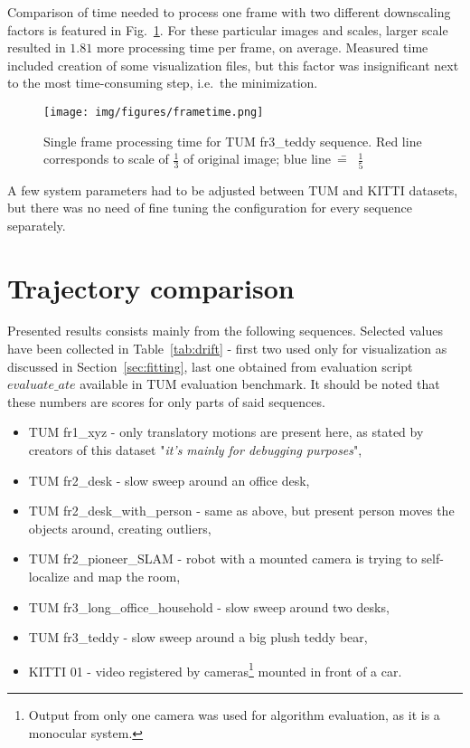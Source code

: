 Comparison of time needed to process one frame with two different downscaling factors is featured in Fig.~\ref{fig:timing}. For these particular images and scales, larger scale resulted in $1.81$ more processing time per frame, on average. Measured time included creation of some visualization files, but this factor was insignificant next to the most time-consuming step, i.e.~the minimization.

\begin{figure}[ht]
	\centering\texttt{[image: img/figures/frametime.png]}
	\caption{ Single frame processing time for TUM fr3\_teddy sequence. Red line corresponds to scale of $\frac{1}{3}$ of original image; blue line~\==~ $\frac{1}{5}$ }
	\label{fig:timing}
\end{figure}


A few system parameters had to be adjusted between TUM and KITTI datasets, but there was no need of fine tuning the configuration for every sequence separately.

\section{Trajectory comparison}

Presented results consists mainly from the following sequences. Selected values have been collected in Table~\ref{tab:drift} - first two used only for visualization as discussed in Section~\ref{sec:fitting}, last one obtained from evaluation script $evaluate\_ate$ available in TUM evaluation benchmark. It should be noted that these numbers are scores for only parts of said sequences.
\begin{itemize}
	\item TUM fr1\_xyz - only translatory motions are present here, as stated by creators of this dataset "\textit{it's mainly for debugging purposes}",
	\item TUM fr2\_desk - slow sweep around an office desk,
	\item TUM fr2\_desk\_with\_person - same as above, but present person moves the objects around, creating outliers,
	\item TUM fr2\_pioneer\_SLAM - robot with a mounted camera is trying to self-localize and map the room,
	\item TUM fr3\_long\_office\_household - slow sweep around two desks,
	\item TUM fr3\_teddy - slow sweep around a big plush teddy bear,
	\item KITTI 01 - video registered by cameras\footnote{Output from only one camera was used for algorithm evaluation, as it is a monocular system.} mounted in front of a car.
\end{itemize}

